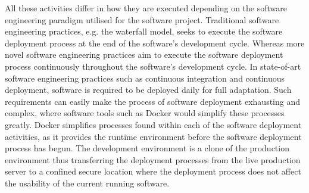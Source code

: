 All these activities differ in how they are executed depending on the software engineering paradigm utilised for the software project. Traditional software engineering practices, e.g. the waterfall model, seeks to execute the software deployment process at the end of the software's development cycle. Whereas more novel software engineering practices aim to execute the software deployment process continuously throughout the software's development cycle. In state-of-art software engineering practices such as continuous integration and continuous deployment, software is required to be deployed daily \cite{meyer2014continuous} for full adaptation. Such requirements can easily make the process of software deployment exhausting and complex, where software tools such as Docker would simplify these processes greatly. Docker simplifies processes found within each of the software deployment activities, as it provides the runtime environment before the software deployment process has begun. The development environment is a clone of the production environment thus transferring the deployment processes from the live production server to a confined secure location where the deployment process does not affect the usability of the current running software.\\






